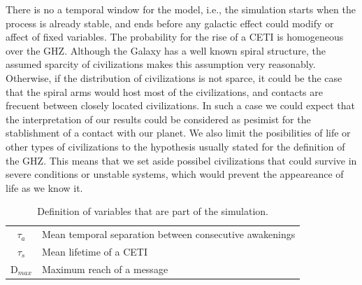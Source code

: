 \documentclass[crop]{CSLB}%
\begin{document}
There is no a temporal window for the model, i.e., the simulation
starts when the process is already stable, and ends before any
galactic effect could modify or affect of fixed variables.
%
The probability for the rise of a CETI is homogeneous over the GHZ.
%
Although the Galaxy has a well known spiral structure, the assumed
sparcity of civilizations makes this assumption very reasonably.
%
Otherwise, if the distribution of civilizations is not sparce, it
could be the case that the spiral arms would host most of the
civilizations, and contacts are frecuent between closely located
civilizations.
%
In such a case we could expect that the interpretation of our results
could be considered as pesimist for the stablishment of a contact with
our planet.
%
We also limit the posibilities of life or other types of civilizations
to the hypothesis usually stated for the definition of the GHZ.
%
This means that we set aside possibel civilizations that could survive
in severe conditions or unstable systems, which would prevent the
appeareance of life as we know it.

 
\setlength{\tabcolsep}{10pt}
\begin{table}
\centering
\begin{tabular}{cl}
\hline
   $\tau_{a}$ & Mean temporal separation between consecutive awakenings \\
   $\tau_{s}$ & Mean lifetime of a CETI \\
   D$_{max}$ & Maximum reach of a message \\
\hline
\end{tabular}
\caption{Definition of variables that are part of the simulation.}
\label{T_simu}
\end{table}
 
\end{document}
